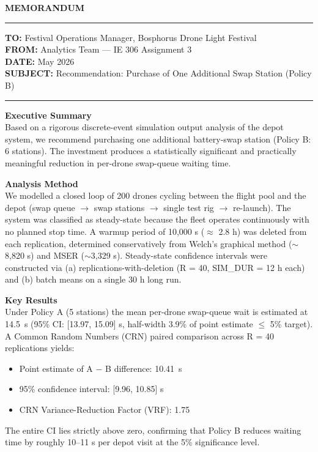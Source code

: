 \documentclass[12pt, a4paper]{article}
\begin{document}
\begin{center}
    \Large \textbf{MEMORANDUM}
\end{center}
\vspace{0.2cm}

\noindent\rule{\textwidth}{1pt}

\noindent \textbf{TO:} \hspace{1.5cm} Festival Operations Manager, Bosphorus Drone Light Festival \\
\textbf{FROM:} \hspace{0.8cm} Analytics Team --- IE 306 Assignment 3 \\
\textbf{DATE:} \hspace{0.9cm} May 2026 \\
\textbf{SUBJECT:} \hspace{0.3cm} Recommendation: Purchase of One Additional Swap Station (Policy B)

\noindent\rule{\textwidth}{0.5pt}
\vspace{0.5cm}

\textbf{Executive Summary} \\
Based on a rigorous discrete-event simulation output analysis of the depot system, we recommend purchasing one additional battery-swap station (Policy B: 6 stations). The investment produces a statistically significant and practically meaningful reduction in per-drone swap-queue waiting time.

\vspace{0.3cm}
\textbf{Analysis Method} \\
We modelled a closed loop of 200 drones cycling between the flight pool and the depot (swap queue $\rightarrow$ swap stations $\rightarrow$ single test rig $\rightarrow$ re-launch). The system was classified as steady-state because the fleet operates continuously with no planned stop time. A warmup period of 10,000 s ($\approx$ 2.8 h) was deleted from each replication, determined conservatively from Welch's graphical method ($\sim$8,820 s) and MSER ($\sim$3,329 s). Steady-state confidence intervals were constructed via (a) replications-with-deletion (R = 40, SIM\_DUR = 12 h each) and (b) batch means on a single 30 h long run.

\vspace{0.3cm}
\textbf{Key Results} \\
Under Policy A (5 stations) the mean per-drone swap-queue wait is estimated at 14.5~s (95\% CI: [13.97, 15.09] s, half-width 3.9\% of point estimate $\leq$ 5\% target). A Common Random Numbers (CRN) paired comparison across R = 40 replications yields:
\begin{itemize}
    \item Point estimate of A $-$ B difference: 10.41~s
    \item 95\% confidence interval: [9.96, 10.85] s
    \item CRN Variance-Reduction Factor (VRF): 1.75
\end{itemize}
The entire CI lies strictly above zero, confirming that Policy B reduces waiting time by roughly 10--11 s per depot visit at the 5\% significance level.
\end{document}
